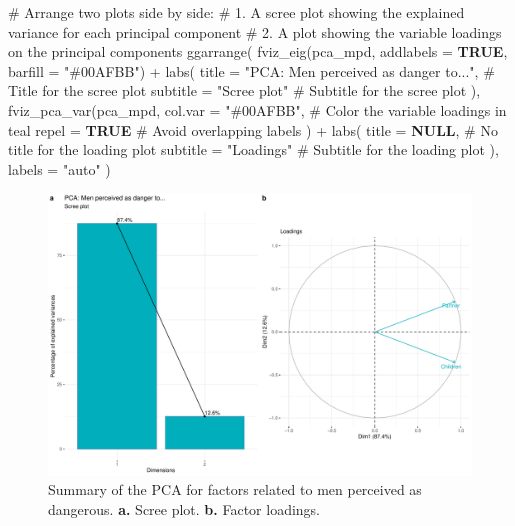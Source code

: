 \documentclass[
  bookmarksnumbered]{article}
\newenvironment{Shaded}{\begin{snugshade}}{\end{snugshade}}
\newcommand{\AttributeTok}[1]{\textcolor[rgb]{0.80,0.80,0.80}{#1}}
\newcommand{\CommentTok}[1]{\textcolor[rgb]{0.50,0.62,0.50}{#1}}
\newcommand{\ConstantTok}[1]{\textcolor[rgb]{0.86,0.64,0.64}{\textbf{#1}}}
\newcommand{\FunctionTok}[1]{\textcolor[rgb]{0.94,0.94,0.56}{#1}}
\newcommand{\NormalTok}[1]{\textcolor[rgb]{0.80,0.80,0.80}{#1}}
\newcommand{\SpecialCharTok}[1]{\textcolor[rgb]{0.86,0.64,0.64}{#1}}
\newcommand{\StringTok}[1]{\textcolor[rgb]{0.80,0.58,0.58}{#1}}
\begin{document}
\begin{Shaded}
\begin{Highlighting}[]
\CommentTok{\# Arrange two plots side by side:}
\CommentTok{\# 1. A scree plot showing the explained variance for each principal component}
\CommentTok{\# 2. A plot showing the variable loadings on the principal components}
\FunctionTok{ggarrange}\NormalTok{(}
  \FunctionTok{fviz\_eig}\NormalTok{(pca\_mpd, }\AttributeTok{addlabels =} \ConstantTok{TRUE}\NormalTok{, }\AttributeTok{barfill =} \StringTok{"\#00AFBB"}\NormalTok{) }\SpecialCharTok{+}
    \FunctionTok{labs}\NormalTok{(}
      \AttributeTok{title =} \StringTok{"PCA: Men perceived as danger to..."}\NormalTok{, }\CommentTok{\# Title for the scree plot}
      \AttributeTok{subtitle =} \StringTok{"Scree plot"} \CommentTok{\# Subtitle for the scree plot}
\NormalTok{    ),}
  \FunctionTok{fviz\_pca\_var}\NormalTok{(pca\_mpd,}
    \AttributeTok{col.var =} \StringTok{"\#00AFBB"}\NormalTok{, }\CommentTok{\# Color the variable loadings in teal}
    \AttributeTok{repel =} \ConstantTok{TRUE} \CommentTok{\# Avoid overlapping labels}
\NormalTok{  ) }\SpecialCharTok{+}
    \FunctionTok{labs}\NormalTok{(}
      \AttributeTok{title =} \ConstantTok{NULL}\NormalTok{, }\CommentTok{\# No title for the loading plot}
      \AttributeTok{subtitle =} \StringTok{"Loadings"} \CommentTok{\# Subtitle for the loading plot}
\NormalTok{    ),}
  \AttributeTok{labels =} \StringTok{"auto"}
\NormalTok{)}
\end{Highlighting}
\end{Shaded}

\begin{figure}
\centering
\includegraphics{Supplementary_material_files/figure-latex/pca-mpd-plot-1.pdf}
\caption{\label{fig:pca-mpd-plot}Summary of the PCA for factors related to men perceived as dangerous. \textbf{a.} Scree plot. \textbf{b.} Factor loadings.}
\end{figure}
\end{document}
